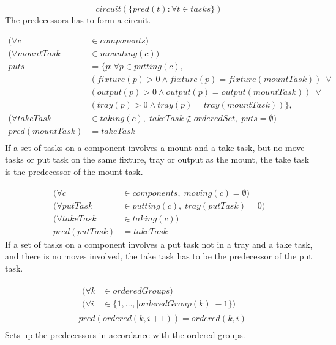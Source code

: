 \documentclass[10pt,a4paper]{report}
\begin{document}
\begin{equation}\label{eq:111}
circuit(\{pred(t) : \forall t \in tasks\})\end{equation}
The predecessors has to form a circuit.

\begin{equation}
\begin{aligned}\label{eq:112}
(\forall c &\in components) \\
(\forall mountTask &\in mounting(c)) \\
puts &= \{p : \forall p \in putting(c),\\
&(fixture(p) > 0 \land fixture(p) = fixture(mountTask)) \; \lor  \\
&(output(p) > 0 \land output(p) = output(mountTask)) \; \lor  \\
&(tray(p) > 0 \land tray(p) = tray(mountTask))\}, \\
(\forall takeTask &\in taking(c), \; takeTask \notin orderedSet, \; puts = \emptyset) \\
pred(mountTask) &= takeTask \\
\end{aligned}
\end{equation}
If a set of tasks on a component involves a mount and a take task, but no move tasks or put task on the same fixture, tray or output as the mount, the take task is the predecessor of the mount task.

\begin{equation}
\begin{aligned}\label{eq:113}
(\forall c &\in components, \; moving(c) = \emptyset)\\
(\forall putTask &\in putting(c), \; tray(putTask) = 0)\\
(\forall takeTask &\in taking(c))\\
pred(putTask) &= takeTask
\end{aligned}
\end{equation}
If a set of tasks on a component involves a put task not in a tray and a take task, and there is no moves involved, the take task has to be the predecessor of the put task.

\begin{equation}
\begin{aligned}\label{eq:114}
&\begin{aligned}
(\forall k &\in orderedGroups) \\
(\forall i &\in \{1 , \ldots , |orderedGroup(k)|-1\}) 
\end{aligned}\\
&pred(ordered(k, i + 1)) = ordered(k, i) \\
\end{aligned}
\end{equation}
Sets up the predecessors in accordance with the ordered groups.
\end{document}
